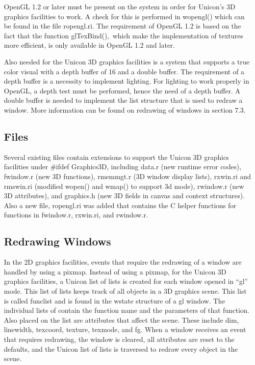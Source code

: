 OpenGL 1.2 or later must be present on the system in order for
Unicon's 3D graphics facilities to work. A check for this is performed
in \textsf{wopengl()} which can be found in the file
\textsf{ropengl.ri}. The requirement of OpenGL 1.2 is based on the
fact that the function \textsf{glTexBind(),}\texttt{ }which make the
implementation of textures more efficient, is only available in OpenGL
1.2 and later.

Also needed for the Unicon 3D graphics facilities is a system that
supports a true color visual with a depth buffer of 16 and a double
buffer. The requirement of a depth buffer is a necessity to implement
lighting. For lighting to work properly in OpenGL, a depth test must
be performed, hence the need of a depth buffer. A double buffer is
needed to implement the list structure that is used to redraw a
window. More information can be found on redrawing of windows in
section 7.3.

\subsection[Files]{Files}

Several existing files contain extensions to support the Unicon 3D
graphics facilities under \#ifdef Graphics3D, including data.r (new
runtime error codes), fwindow.r (new 3D functions), rmemmgt.r (3D
window display lists), rxwin.ri and rmswin.ri (modified wopen() and
wmap() to support 3d mode), rwindow.r (new 3D attributes), and
graphics.h (new 3D fields in canvas and context structures). Also a
new file, ropengl.ri was added that contains the C helper functions
for functions in \textsf{fwindow.r, rxwin.ri}, and \textsf{rwindow.r}.

\subsection{Redrawing Windows}

In the 2D graphics facilities, events that require the redrawing of a
window are handled by using a pixmap. Instead of using a pixmap, for
the Unicon 3D graphics facilities, a Unicon list of lists is created
for each window opened in \textsf{{}``gl''} mode. This list of lists
keeps track of all objects in a 3D graphics scene. This list is called
\textsf{funclist} and is found in the wstate structure of a
\textsf{{\textquotedbl}gl{\textquotedbl}} window. The individual lists
of contain the function name and the parameters of that function. Also
placed on the list are attributes that affect the scene. These include
\textsf{dim}, \textsf{linewidth}, \textsf{texcoord}, \textsf{texture},
\textsf{texmode}, and \textsf{fg}. When a window receives an event
that requires redrawing, the window is cleared, all attributes are
reset to the defaults, and the Unicon list of lists is traversed to
redraw every object in the scene.

